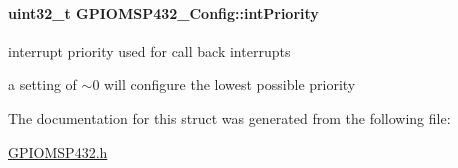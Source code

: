\paragraph[{int\+Priority}]{\setlength{\rightskip}{0pt plus 5cm}uint32\+\_\+t G\+P\+I\+O\+M\+S\+P432\+\_\+\+Config\+::int\+Priority}\label{struct_g_p_i_o_m_s_p432___config_a6cfc0b5cac2a793b7c2ff64b05ff0994}
interrupt priority used for call back interrupts

a setting of $\sim$0 will configure the lowest possible priority 

The documentation for this struct was generated from the following file\+:\begin{DoxyCompactItemize}
\item 
\hyperlink{_g_p_i_o_m_s_p432_8h}{G\+P\+I\+O\+M\+S\+P432.\+h}\end{DoxyCompactItemize}
